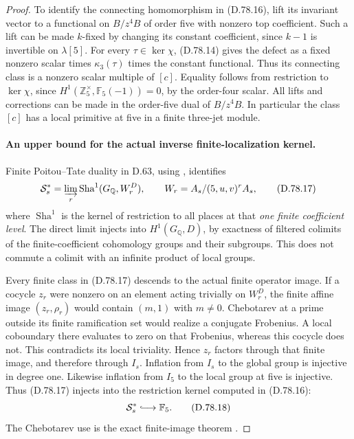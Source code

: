 \begin{proof}
To identify the connecting homomorphism in (D.78.16),
lift its invariant vector to a functional on \(B/z^4B\)
of order five with nonzero top coefficient. Such a lift
can be made \(k\)-fixed by changing its constant coefficient,
since \(k-1\) is invertible on \(\lambda[5]\).
For every \(\tau\in\ker\chi\), (D.78.14) gives the defect
as a fixed nonzero scalar times
\(\kappa_3(\tau)\) times the constant functional.
Thus its connecting class is a nonzero scalar multiple
of \([c]\). Equality follows from restriction to
\(\ker\chi\), since
\(H^1(\mathbb Z_5^\times,\mathbb F_5(-1))=0\), by the
order-four scalar. All lifts and corrections can be
made in the order-five dual of \(B/z^4B\).
In particular the class \([c]\) has a local primitive at
five in a finite three-jet module.

\paragraph{An upper bound for the actual inverse finite-localization kernel.}
Finite Poitou--Tate duality in D.63,
using \cite[I, Theorem 4.10(a)]{DE_MilneADT}, identifies
\[
 \mathcal S_s^*=\varinjlim_r
       \operatorname{Sha}^1(G_{\mathbb Q},W_r^D),
       \qquad W_r=A_s/(5,u,v)^rA_s,                     \tag{D.78.17}
\]
where \(\operatorname{Sha}^1\) is the kernel of restriction to all places
at that \emph{one finite coefficient level}. The direct
limit injects into \(H^1(G_{\mathbb Q},D)\), by exactness
of filtered colimits of the finite-coefficient cohomology
groups and their subgroups. This does not commute a
colimit with an infinite product of local groups.

Every finite class in (D.78.17) descends to the actual
finite operator image. If a cocycle \(z_r\) were nonzero
on an element acting trivially on \(W_r^D\), the finite
affine image \((z_r,\rho_r)\) would contain
\((m,1)\) with \(m\ne0\). Chebotarev at a prime outside
its finite ramification set would realize a conjugate
Frobenius. A local coboundary there evaluates to zero on
that Frobenius, whereas this cocycle does not. This
contradicts its local triviality. Hence \(z_r\) factors
through that finite image, and therefore through \(I_s\).
Inflation from \(I_s\) to the global group is injective
in degree one. Likewise inflation from \(I_5\) to the
local group at five is injective. Thus (D.78.17) injects
into the restriction kernel computed in (D.78.16):
\[
                         \mathcal S_s^*
                                  \lhook\joinrel\longrightarrow\mathbb F_5.
                                                               \tag{D.78.18}
\]
The Chebotarev use is the exact finite-image theorem
\cite[V, Theorem 3.23]{PBC_MilneCFT}.


\end{proof}
